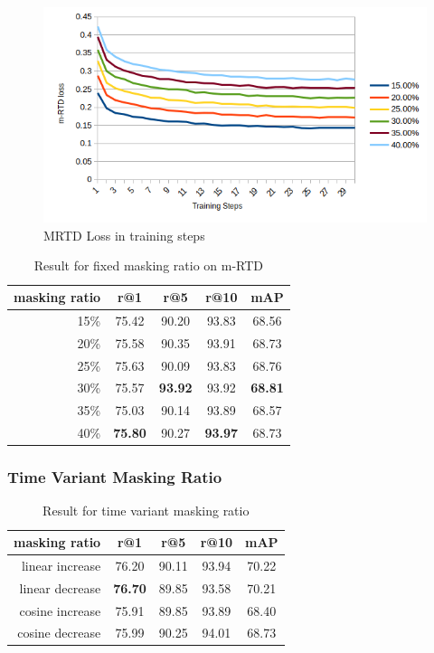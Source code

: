 \begin{figure}
    \includegraphics[width=\linewidth]{img/mrtd_loss.png}
    \caption{MRTD Loss in training steps}
    \label{img:mrtd_loss}
\end{figure}

\begin{table}[htbp]
  \centering
  \caption{Result for fixed masking ratio on m-RTD}
  \begin{tabular}{rcccc}
    masking ratio & r@1 & r@5 & r@10 & mAP \\ \hline
    15\% & 75.42 & 90.20 & 93.83 & 68.56 \\
    20\% & 75.58 & 90.35 & 93.91 & 68.73 \\
    25\% & 75.63 & 90.09 & 93.83 & 68.76 \\
    30\% & 75.57 & \textbf{93.92} & 93.92 & \textbf{68.81} \\
    35\% & 75.03 & 90.14 & 93.89 & 68.57 \\
    40\% & \textbf{75.80} & 90.27 & \textbf{93.97} & 68.73
  \end{tabular}
\end{table}

\subsubsection{Time Variant Masking Ratio}
\begin{table}[htbp]
  \centering
  \caption{Result for time variant masking ratio}
  \begin{tabular}{rcccc}
    \centering
    masking ratio & r@1 & r@5 & r@10 & mAP\\ \hline
    linear increase & 76.20 & 90.11 & 93.94 & 70.22 \\
    linear decrease & \textbf{76.70} & 89.85 & 93.58 & 70.21 \\
    cosine increase & 75.91 & 89.85 & 93.89 & 68.40 \\
    cosine decrease & 75.99 & 90.25 & 94.01 & 68.73 \\
  \end{tabular}
\end{table}


